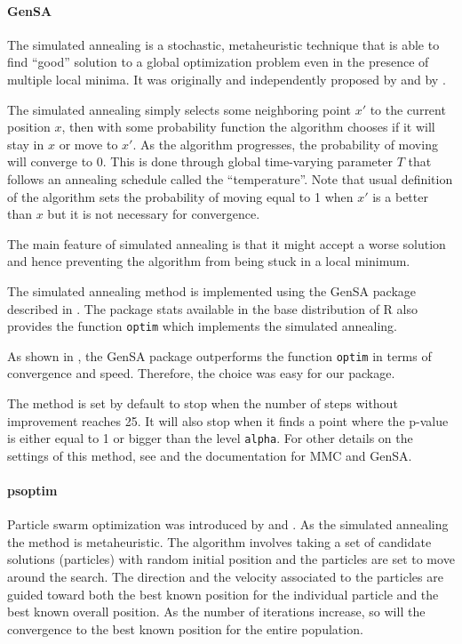 \documentclass[11pt]{article}\usepackage[]{graphicx}\usepackage[]{color}
\newcommand{\pkg}[1]{{\normalfont\fontseries{b}\selectfont #1}}
\let\proglang=\textsf
\let\code=\texttt
\begin{document}
	\paragraph{GenSA}

	The simulated annealing is a stochastic, metaheuristic technique that is able to find ``good'' solution to a global optimization problem even in the presence of multiple local minima. It was originally and independently proposed by \cite{kirkpatrick_optimization_1983} and by \cite{cerny_thermodynamical_1985}.

	The simulated annealing simply selects some neighboring point $x'$ to the current position $x$, then with some probability function the algorithm chooses if it will stay in $x$ or move to $x'$. As the algorithm progresses, the probability of moving will converge to 0. This is done through global time-varying parameter $T$ that follows an annealing schedule called the ``temperature''.  Note that usual definition of the algorithm sets the probability of moving equal to 1 when $x'$ is a better than $x$ but it is not necessary for convergence.

	The main feature of simulated annealing is that it might accept a worse solution and hence preventing the algorithm from being stuck in a local minimum.

	The simulated annealing method is implemented using the \pkg{GenSA} package described in \cite{yang_xiang_generalized_2013}. The package \pkg{stats} available in the base distribution of \proglang{R} also provides the function \code{optim} which implements the simulated annealing.

	As shown in \cite{mullen_continuous_2014}, the \pkg{GenSA} package outperforms the function \code{optim} in terms of convergence and speed. Therefore, the choice was easy for our package.

	The method is set by default to stop when the number of steps without improvement reaches 25. It will also stop when it finds a point where the p-value is either equal to 1 or bigger than the level \code{alpha}. For other details on the settings of this method, see \cite{yang_xiang_generalized_2013} and the documentation for \pkg{MMC} and \pkg{GenSA}.



	\paragraph{psoptim}


	Particle swarm optimization was introduced by \cite{eberhart_new_1995} and \cite{shi_modified_1998}. As the simulated annealing the method is metaheuristic. The algorithm involves taking a set of candidate solutions (particles) with random initial position and the particles are set to move around the search. The direction and the velocity associated to the particles are guided toward both the best known position for the individual particle and the best known overall position. As the number of iterations increase, so will the convergence to the best known position for the entire population.
\end{document}
